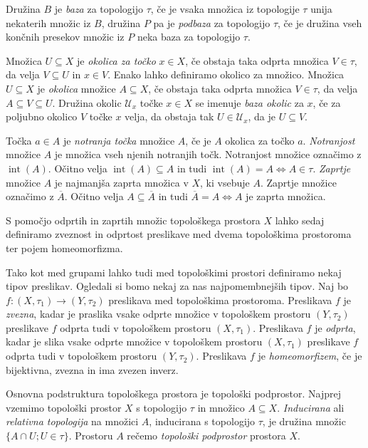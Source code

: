 \documentclass[mat1]{fmfdelo}
\newcommand{\Ucurl}{\mathcal{U}}
\newcommand{\closure}[1]{\overline{#1}}
\DeclareMathOperator{\interior}{int}
\begin{document}
Družina $B$ je \emph{baza} za topologijo $\tau$, če je vsaka množica iz topologije $\tau$ unija nekaterih množic iz $B$, družina $P$ pa je \emph{podbaza} za topologijo $\tau$, če je družina vseh končnih presekov množic iz $P$ neka baza za topologijo $\tau$.

Množica $U \subseteq X$ je \emph{okolica za točko} $x \in X$, če obstaja taka odprta množica $V \in \tau$, da velja $V \subseteq U$ in $x \in V$. Enako lahko definiramo okolico za množico.
Množica $U \subseteq X$ je \emph{okolica} množice $A \subseteq X$, če obstaja taka odprta množica $V \in \tau$, da velja $A \subseteq V \subseteq U$.
Družina okolic $\Ucurl_x$ točke $x \in X$ se imenuje \emph{baza okolic} za $x$, če za poljubno okolico $V$ točke $x$ velja, da obstaja tak $U \in \Ucurl_x$, da je $U \subseteq V$.

Točka $a \in A$ je \emph{notranja točka} množice $A$, če je $A$ okolica za točko $a$.
\emph{Notranjost} množice $A$ je množica vseh njenih notranjih točk. Notranjost množice označimo z $\interior(A)$. Očitno velja $\interior(A) \subseteq A$ in tudi $\interior(A) = A \iff A \in \tau$.
\emph{Zaprtje} množice $A$ je najmanjša zaprta množica v $X$, ki vsebuje $A$. Zaprtje množice označimo z $\closure{A}$. Očitno velja $A \subseteq \closure{A}$ in tudi $\closure{A} = A \iff A$ je zaprta množica.

S pomočjo odprtih in zaprtih množic topološkega prostora $X$ lahko sedaj de\-fi\-ni\-ra\-mo zveznost in odprtost preslikave med dvema topološkima prostoroma ter pojem ho\-me\-o\-mor\-fiz\-ma.

Tako kot med grupami lahko tudi med topološkimi prostori definiramo nekaj tipov preslikav. Ogledali si bomo nekaj za nas najpomembnejših tipov.
Naj bo $f\colon (X, \tau_1) \to (Y, \tau_2)$ preslikava med topološkima prostoroma.
Preslikava $f$ je \emph{zvezna}, kadar je praslika vsake odprte množice v topološkem prostoru $(Y, \tau_2)$  preslikave $f$ odprta tudi v topološkem prostoru $(X, \tau_1)$.
Preslikava $f$ je \emph{odprta}, kadar je slika vsake odprte množice v topološkem prostoru $(X, \tau_1)$ preslikave $f$ odprta tudi v topološkem prostoru $(Y, \tau_2)$.
Preslikava $f$ je \emph{homeomorfizem}, če je bijektivna, zvezna in ima zvezen inverz.

Osnovna podstruktura topološkega prostora je topološki podprostor.
Najprej vzemimo topološki prostor $X$ s topologijo $\tau$ in množico $A \subseteq X$. \emph{Inducirana} ali \emph{relativna topologija} na množici $A$, inducirana s topologijo $\tau$, je družina množic $\lbrace A \cap U ; U \in \tau \rbrace$. Prostoru $A$ rečemo \emph{topološki podprostor} prostora $X$.
\end{document}
